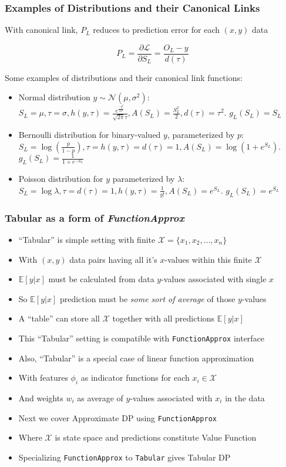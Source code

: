 \documentclass[handout]{beamer}
\begin{document}
\begin{frame}
\frametitle{Examples of Distributions and their Canonical Links}
With canonical link, $P_L$ reduces to prediction error for each $(x,y)$ data
\begin{theorem}
$$P_L =  \frac {\partial \mathcal{L}}{\partial S_L} = \frac {O_L - y} {d(\tau)}$$
\end{theorem}
\pause
Some examples of distributions and their canonical link functions:
\begin{itemize}
\item Normal distribution $y \sim \mathcal{N}(\mu, \sigma^2)$: $S_L = \mu, \tau = \sigma, h(y, \tau) = \frac {e^{\frac {-y^2} {2 \tau^2}}} {\sqrt{2 \pi} \tau}, A(S_L) = \frac {S_L^2} {2}, d(\tau) = \tau^2$. $g_L(S_L) = S_L$
\item Bernoulli distribution for binary-valued $y$, parameterized by $p$: $S_L = \log{(\frac p {1-p})}, \tau = h(y, \tau) = d(\tau) = 1, A(S_L) = \log{(1+e^{S_L})}$. $g_L(S_L) = \frac 1 {1+e^{-S_L}}$
\item Poisson distribution for $y$ parameterized by $\lambda$:
$S_L = \log{\lambda}, \tau = d(\tau) = 1, h(y, \tau) = \frac 1 {y!}, A(S_L) = e^{S_L}$.  $g_L(S_L) = e^{S_L}$
\end{itemize}
\end{frame}

\begin{frame}
\frametitle{Tabular as a form of {\em FunctionApprox}}
\pause
\begin{itemize}[<+->]
\item ``Tabular'' is simple setting with finite $\mathcal{X} = \{x_1, x_2, \ldots, x_n\}$
\item With $(x,y)$ data pairs having all it's $x$-values within this finite $\mathcal{X}$
\item $\mathbb{E}[y|x]$ must be calculated from data $y$-values associated with single $x$
\item So $\mathbb{E}[y|x]$ prediction must be {\em some sort of average} of those $y$-values
\item A ``table'' can store all $\mathcal{X}$ together with all predictions $\mathbb{E}[y|x]$
\item This ``Tabular'' setting is compatible with \lstinline{FunctionApprox} interface
\item Also, ``Tabular'' is a special case of linear function approximation
\item With features $\phi_i$ as indicator functions for each $x_i \in \mathcal{X}$
\item And weights $w_i$ as average of $y$-values associated with $x_i$ in the data
\item Next we cover Approximate DP using \lstinline{FunctionApprox}
\item Where $\mathcal{X}$ is state space and predictions constitute Value Function
\item Specializing \lstinline{FunctionApprox} to \lstinline{Tabular} gives Tabular DP
\end{itemize}
\end{frame}
\end{document}
